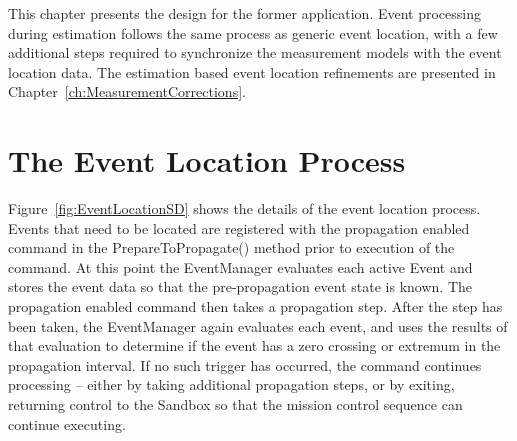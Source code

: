 This chapter presents the design for the former application.  Event processing during estimation follows the same process as generic event location, with a few additional steps required to synchronize the measurement models with the event location data.  The estimation based event location refinements are presented in Chapter~\ref{ch:MeasurementCorrections}.

\section{The Event Location Process}

Figure~\ref{fig:EventLocationSD} shows the details of the event location process.  Events that need to be located are registered with the propagation enabled command in the PrepareToPropagate() method prior to execution of the command.  At this point the EventManager evaluates each active Event and stores the event data so that the pre-propagation event state is known.  The propagation enabled command then takes a propagation step.  After the step has been taken, the EventManager again evaluates each event, and uses the results of that evaluation to determine if the event has a zero crossing or extremum in the propagation interval.  If no such trigger has occurred, the command continues processing -- either by taking additional propagation steps, or by exiting, returning control to the Sandbox so that the mission control sequence can continue executing.

